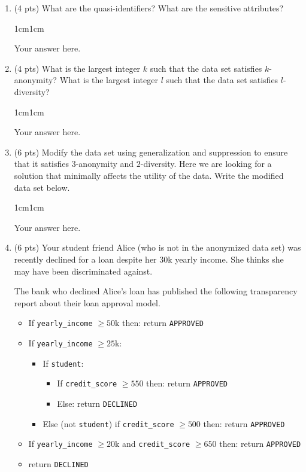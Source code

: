 \documentclass[11pt,letterpaper]{article}
\newenvironment{answer}{\em \color{blue} \begin{adjustwidth}{1cm}{1cm}}{\end{adjustwidth}}
\begin{document}
\begin{enumerate}
		\item (4 pts) What are the quasi-identifiers? What are the sensitive attributes? 
	
	\begin{answer}
	
		Your answer here.
		
	\end{answer}
	
		\item (4 pts) What is the largest integer $k$ such that the data set satisfies $k$-anonymity? What is the largest integer $l$ such that the data set satisfies $l$-diversity? 
	
	\begin{answer}
	
		Your answer here.
		
	\end{answer}

	\item (6 pts) Modify the data set using generalization and suppression to ensure that it satisfies $3$-anonymity and $2$-diversity. Here we are looking for a solution that minimally affects the utility of the data. Write the modified data set below.
	
	\begin{answer}
	
		Your answer here.
		
	\end{answer}
	
	\item (6 pts) Your student friend Alice (who is not in the anonymized data set) was recently declined for a loan despite her 30k yearly income. She thinks she may have been discriminated against. 
	
	The bank who declined Alice's loan has published the following transparency report about their loan approval model. 
	
	\begin{itemize}
		\item If \texttt{yearly\_income} $\geq 50$k then: return \texttt{APPROVED}
		\item If \texttt{yearly\_income} $\geq 25$k:
		\begin{itemize}
			\item If \texttt{student}:
				\begin{itemize} 
					\item If \texttt{credit\_score} $\geq 550$ then:	return \texttt{APPROVED}	
					\item Else: return \texttt{DECLINED}					
				\end{itemize}	
			\item Else (not \texttt{student}) if \texttt{credit\_score} $\geq 500$ then: return \texttt{APPROVED}
		\end{itemize}		 
		\item If \texttt{yearly\_income} $\geq 20$k and \texttt{credit\_score} $\geq 650$ then: return \texttt{APPROVED}
		\item return \texttt{DECLINED}
	\end{itemize}
	

\end{enumerate}
\end{document}
